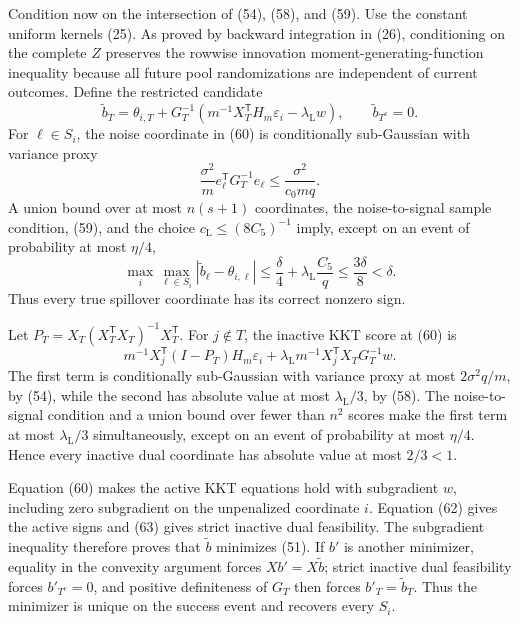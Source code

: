 Condition now on the intersection of (54), (58), and (59).  Use the constant uniform kernels (25).  As proved by backward integration in (26), conditioning on the complete \(Z\) preserves the rowwise innovation moment-generating-function inequality because all future pool randomizations are independent of current outcomes.  Define the restricted candidate
\[
 \widetilde b_T=\theta_{i,T}
 +G_T^{-1}\left(m^{-1}X_T^{\mathsf T}H_m\varepsilon_i
                    -\lambda_{\mathrm L}w\right),
 \qquad \widetilde b_{T^c}=0.
 \tag{60}
\]
For \(\ell\in S_i\), the noise coordinate in (60) is conditionally sub-Gaussian with variance proxy
\[
 \frac{\sigma^2}{m}e_\ell^{\mathsf T}G_T^{-1}e_\ell
 \le\frac{\sigma^2}{c_0mq}.
 \tag{61}
\]
A union bound over at most \(n(s+1)\) coordinates, the noise-to-signal sample condition, (59), and the choice \(c_{\mathrm L}\le(8C_5)^{-1}\) imply, except on an event of probability at most \(\eta/4\),
\[
 \max_i\max_{\ell\in S_i}|\widetilde b_\ell-\theta_{i,\ell}|
 \le\frac\delta4+\lambda_{\mathrm L}\frac{C_5}{q}
 \le\frac{3\delta}{8}<\delta.
 \tag{62}
\]
Thus every true spillover coordinate has its correct nonzero sign.

Let \(P_T=X_T(X_T^{\mathsf T}X_T)^{-1}X_T^{\mathsf T}\).  For \(j\notin T\), the inactive KKT score at (60) is
\[
 m^{-1}X_j^{\mathsf T}(I-P_T)H_m\varepsilon_i
 +\lambda_{\mathrm L}m^{-1}X_j^{\mathsf T}X_TG_T^{-1}w.
 \tag{63}
\]
The first term is conditionally sub-Gaussian with variance proxy at most \(2\sigma^2q/m\), by (54), while the second has absolute value at most \(\lambda_{\mathrm L}/3\), by (58).  The noise-to-signal condition and a union bound over fewer than \(n^2\) scores make the first term at most \(\lambda_{\mathrm L}/3\) simultaneously, except on an event of probability at most \(\eta/4\).  Hence every inactive dual coordinate has absolute value at most \(2/3<1\).

Equation (60) makes the active KKT equations hold with subgradient \(w\), including zero subgradient on the unpenalized coordinate \(i\).  Equation (62) gives the active signs and (63) gives strict inactive dual feasibility.  The subgradient inequality therefore proves that \(\widetilde b\) minimizes (51).  If \(b'\) is another minimizer, equality in the convexity argument forces \(Xb'=X\widetilde b\); strict inactive dual feasibility forces \(b'_{T^c}=0\), and positive definiteness of \(G_T\) then forces \(b'_T=\widetilde b_T\).  Thus the minimizer is unique on the success event and recovers every \(S_i\).

